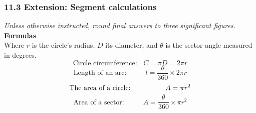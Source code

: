 

\fancyhead[LE]{\thepage}



\subsubsection*{11.3 Extension: Segment calculations}
\emph{Unless otherwise instructed, round final answers to three significant figures.}\\
\textbf{Formulas}\\
Where $r$ is the circle's radius, $D$ its diameter, and $\theta$ is the sector angle measured in degrees.
  \[\text{Circle circumference: } \;\; C=\pi D = 2\pi r\]
  \[\text{Length of an arc: } \hspace{1cm} l=\frac{\theta}{360} \times 2\pi r\]
  \[\text{The area of a circle: } \hspace{1.6cm}  A=\pi r^2\]
  \[\text{Area of a sector: } \hspace{1cm}  A=\frac{\theta}{360} \times \pi r^2\]
  \vspace{0.25cm}
